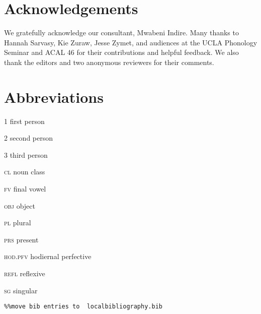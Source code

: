 \documentclass[output=paper]{langsci/langscibook}
\begin{document}
\section{Acknowledgements} We gratefully acknowledge our consultant, Mwabeni Indire. Many thanks to Hannah Sarvasy, Kie Zuraw, Jesse Zymet, and audiences at the UCLA Phonology Seminar and ACAL 46 for their contributions and helpful feedback. We also thank the editors and two anonymous reviewers for their comments.

\section*{Abbreviations}

\textsc{1}    first person

\textsc{2}    second person

\textsc{3}    third person

\textsc{cl}    noun class

\textsc{fv}    final vowel

\textsc{obj}    object

\textsc{pl}    plural

\textsc{prs}    present

\textsc{hod.pfv}  hodiernal perfective

\textsc{refl}    reflexive

\textsc{sg}    singular
  

\begin{verbatim}%%move bib entries to  localbibliography.bib


\end{verbatim}
 

\printbibliography[heading=subbibliography,notkeyword=this]
\end{document}
